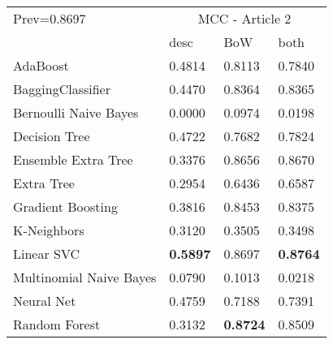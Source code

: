 \begin{tabular}{|l|l|l|l| }
\hline
Prev=0.8697 &  \multicolumn{3}{c|}{MCC - Article 2} \\
\cline{2-4} & desc & BoW & both \\ \hline
AdaBoost                & 0.4814 & 0.8113 & 0.7840\\
BaggingClassifier       & 0.4470 & 0.8364 & 0.8365\\
Bernoulli Naive Bayes   & 0.0000 & 0.0974 & 0.0198\\
Decision Tree           & 0.4722 & 0.7682 & 0.7824\\
Ensemble Extra Tree     & 0.3376 & 0.8656 & 0.8670\\
Extra Tree              & 0.2954 & 0.6436 & 0.6587\\
Gradient Boosting       & 0.3816 & 0.8453 & 0.8375\\
K-Neighbors             & 0.3120 & 0.3505 & 0.3498\\
Linear SVC              & {\bf 0.5897} & 0.8697 & {\bf 0.8764}\\
Multinomial Naive Bayes & 0.0790 & 0.1013 & 0.0218\\
Neural Net              & 0.4759 & 0.7188 & 0.7391\\
Random Forest           & 0.3132 & {\bf 0.8724} & 0.8509\\
\hline
\end{tabular}